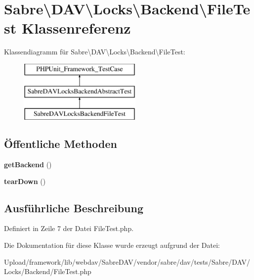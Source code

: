 \hypertarget{class_sabre_1_1_d_a_v_1_1_locks_1_1_backend_1_1_file_test}{}\section{Sabre\textbackslash{}D\+AV\textbackslash{}Locks\textbackslash{}Backend\textbackslash{}File\+Test Klassenreferenz}
\label{class_sabre_1_1_d_a_v_1_1_locks_1_1_backend_1_1_file_test}
Klassendiagramm für Sabre\textbackslash{}D\+AV\textbackslash{}Locks\textbackslash{}Backend\textbackslash{}File\+Test\+:\begin{figure}[H]
\begin{center}
\leavevmode
\includegraphics[height=3.000000cm]{class_sabre_1_1_d_a_v_1_1_locks_1_1_backend_1_1_file_test}
\end{center}
\end{figure}
\subsection*{Öffentliche Methoden}
\begin{DoxyCompactItemize}
\item 
\mbox{\label{class_sabre_1_1_d_a_v_1_1_locks_1_1_backend_1_1_file_test_a374b9fa0698ff8cdaa8c92b25bd972ab}} 
{\bfseries get\+Backend} ()
\item 
\mbox{\label{class_sabre_1_1_d_a_v_1_1_locks_1_1_backend_1_1_file_test_a4378ec3b3c6f6459d68d4030793fc949}} 
{\bfseries tear\+Down} ()
\end{DoxyCompactItemize}


\subsection{Ausführliche Beschreibung}


Definiert in Zeile 7 der Datei File\+Test.\+php.



Die Dokumentation für diese Klasse wurde erzeugt aufgrund der Datei\+:\begin{DoxyCompactItemize}
\item 
Upload/framework/lib/webdav/\+Sabre\+D\+A\+V/vendor/sabre/dav/tests/\+Sabre/\+D\+A\+V/\+Locks/\+Backend/File\+Test.\+php\end{DoxyCompactItemize}
